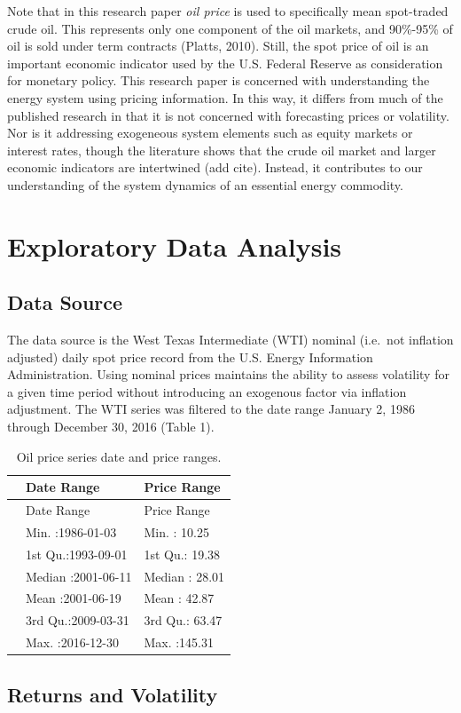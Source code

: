 \documentclass[]{article}
\begin{document}
Note that in this research paper \emph{oil price} is used to
specifically mean spot-traded crude oil. This represents only one
component of the oil markets, and 90\%-95\% of oil is sold under term
contracts (Platts, 2010). Still, the spot price of oil is an important
economic indicator used by the U.S. Federal Reserve as consideration for
monetary policy. This research paper is concerned with understanding the
energy system using pricing information. In this way, it differs from
much of the published research in that it is not concerned with
forecasting prices or volatility. Nor is it addressing exogeneous system
elements such as equity markets or interest rates, though the literature
shows that the crude oil market and larger economic indicators are
intertwined (add cite). Instead, it contributes to our understanding of
the system dynamics of an essential energy commodity.

\section{Exploratory Data Analysis}\label{exploratory-data-analysis}

\subsection{Data Source}\label{data-source}

The data source is the West Texas Intermediate (WTI) nominal (i.e.~not
inflation adjusted) daily spot price record from the U.S. Energy
Information Administration. Using nominal prices maintains the ability
to assess volatility for a given time period without introducing an
exogenous factor via inflation adjustment. The WTI series was filtered
to the date range January 2, 1986 through December 30, 2016 (Table 1).

\begin{longtable}[]{@{}lll@{}}
\caption{Oil price series date and price ranges.}\tabularnewline
\toprule
& Date Range & Price Range\tabularnewline
\midrule
\endfirsthead
\toprule
& Date Range & Price Range\tabularnewline
\midrule
\endhead
& Min. :1986-01-03 & Min. : 10.25\tabularnewline
& 1st Qu.:1993-09-01 & 1st Qu.: 19.38\tabularnewline
& Median :2001-06-11 & Median : 28.01\tabularnewline
& Mean :2001-06-19 & Mean : 42.87\tabularnewline
& 3rd Qu.:2009-03-31 & 3rd Qu.: 63.47\tabularnewline
& Max. :2016-12-30 & Max. :145.31\tabularnewline
\bottomrule
\end{longtable}

\subsection{Returns and Volatility}\label{returns-and-volatility}
\end{document}
